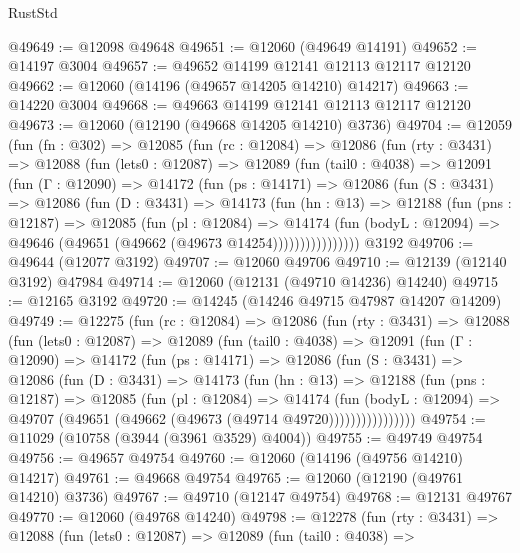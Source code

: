 \begin{lexlean}{RustStd}
\begin{coremodule}
@49649 := @12098 @49648
@49651 := @12060 (@49649 @14191)
@49652 := @14197 @3004
@49657 := @49652 @14199 @12141 @12113 @12117 @12120
@49662 := @12060 (@14196 (@49657 @14205 @14210) @14217)
@49663 := @14220 @3004
@49668 := @49663 @14199 @12141 @12113 @12117 @12120
@49673 := @12060 (@12190 (@49668 @14205 @14210) @3736)
@49704 := @12059
    (fun (fn : @302) =>
    @12085
      (fun (rc : @12084) =>
      @12086
        (fun (rty : @3431) =>
        @12088
          (fun (lets0 : @12087) =>
          @12089
            (fun (tail0 : @4038) =>
            @12091
              (fun (Γ : @12090) =>
              @14172
                (fun (ps : @14171) =>
                @12086
                  (fun (S : @3431) =>
                  @12086
                    (fun (D : @3431) =>
                    @14173
                      (fun (hn : @13) =>
                      @12188
                        (fun (pns : @12187) =>
                        @12085
                          (fun (pl : @12084) =>
                          @14174
                            (fun (bodyL : @12094) =>
                            @49646 (@49651 (@49662 (@49673 @14254))))))))))))))))
    @3192
@49706 := @49644 (@12077 @3192)
@49707 := @12060 @49706
@49710 := @12139 (@12140 @3192) @47984
@49714 := @12060 (@12131 (@49710 @14236) @14240)
@49715 := @12165 @3192
@49720 := @14245 (@14246 @49715 @47987 @14207 @14209)
@49749 := @12275
    (fun (rc : @12084) =>
    @12086
      (fun (rty : @3431) =>
      @12088
        (fun (lets0 : @12087) =>
        @12089
          (fun (tail0 : @4038) =>
          @12091
            (fun (Γ : @12090) =>
            @14172
              (fun (ps : @14171) =>
              @12086
                (fun (S : @3431) =>
                @12086
                  (fun (D : @3431) =>
                  @14173
                    (fun (hn : @13) =>
                    @12188
                      (fun (pns : @12187) =>
                      @12085
                        (fun (pl : @12084) =>
                        @14174
                          (fun (bodyL : @12094) =>
                          @49707 (@49651 (@49662 (@49673 (@49714 @49720))))))))))))))))
@49754 := @11029 (@10758 (@3944 (@3961 @3529) @4004))
@49755 := @49749 @49754
@49756 := @49657 @49754
@49760 := @12060 (@14196 (@49756 @14210) @14217)
@49761 := @49668 @49754
@49765 := @12060 (@12190 (@49761 @14210) @3736)
@49767 := @49710 (@12147 @49754)
@49768 := @12131 @49767
@49770 := @12060 (@49768 @14240)
@49798 := @12278
    (fun (rty : @3431) =>
    @12088
      (fun (lets0 : @12087) =>
      @12089
        (fun (tail0 : @4038) =>

\end{coremodule}
\end{lexlean}
